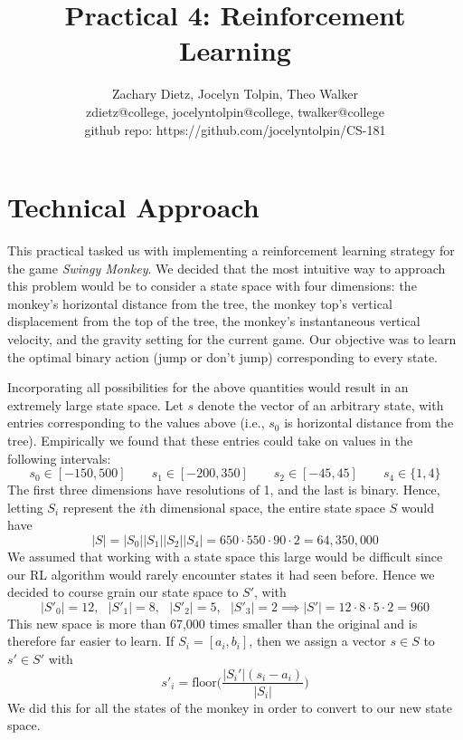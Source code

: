 \documentclass[11pt]{article}
\title{\vspace{-4ex}Practical 4: Reinforcement Learning}
\author{Zachary Dietz, Jocelyn Tolpin, Theo Walker \\ zdietz@college, jocelyntolpin@college, twalker@college \\ github repo: https://github.com/jocelyntolpin/CS-181\vspace{-2ex}}
\begin{document}
\maketitle{}



\section{Technical Approach}
This practical tasked us with implementing a reinforcement learning strategy for the game \emph{Swingy Monkey}. We decided that the most intuitive way to approach this problem would be to consider a state space with four dimensions: the monkey's horizontal distance from the tree, the monkey top's vertical displacement from the top of the tree, the monkey's instantaneous vertical velocity, and the gravity setting for the current game. Our objective was to learn the optimal binary action (jump or don't jump) corresponding to every state.

Incorporating all possibilities for the above quantities would result in an extremely large state space. Let $s$ denote the vector of an arbitrary state, with entries corresponding to the values above (i.e., $s_{0}$ is horizontal distance from the tree). Empirically we found that these entries could take on values in the following intervals:
$$s_{0}\in{}[-150,500]\qquad{}s_{1}\in{}[-200,350]\qquad{}s_{2}\in{}[-45,45]\qquad{}s_{4}\in{}\{1,4\}$$
The first three dimensions have resolutions of 1, and the last is binary. Hence, letting $S_{i}$ represent the $i$th dimensional space, the entire state space $S$ would have
$$|S|=|S_0||S_1||S_2||S_4|=650\cdot{}550\cdot{}90\cdot{}2=64,350,000$$
We assumed that working with a state space this large would be difficult since our RL algorithm would rarely encounter states it had seen before. Hence we decided to course grain our state space to $S'$, with
$$|S'_0|=12,\text{ }|S'_{1}|=8,\text{ }|S'_{2}|=5,\text{ }|S'_{3}|=2\implies{}|S'|=12\cdot{}8\cdot{}5\cdot{}2=960$$
This new space is more than 67,000 times smaller than the original and is therefore far easier to learn. If $S_{i}=[a_i,b_i]$, then we assign a vector $s\in{}S$ to $s'\in{}S'$ with
$$s'_{i}=\text{floor}\Big(\frac{|S_{i}'|(s_{i}-a_i)}{|S_{i}|}\Big)$$
We did this for all the states of the monkey in order to convert to our new state space.
\end{document}
